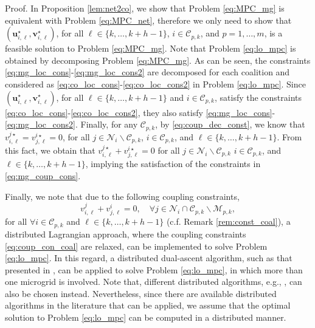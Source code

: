 \begin{pf*}{Proof.}
	In Proposition \ref{lem:net2co}, we show that Problem \eqref{eq:MPC_mg} is equivalent with Problem \eqref{eq:MPC_net}, therefore we only need to show that $(\bm{u}_{i,\ell}^{\star},\bm{v}_{i,\ell}^{\star})$, for all $\ell \in\{k,\dots, k+h-1 \}$, $i\in\mathcal{C}_{p,k}$, and $p=1,\dots,m$, is a feasible solution to Problem \eqref{eq:MPC_mg}. Note that Problem \eqref{eq:lo_mpc} is obtained by decomposing Problem \eqref{eq:MPC_mg}.  As can be seen, the constraints \eqref{eq:mg_loc_cons}-\eqref{eq:mg_loc_cons2} are decomposed for each coalition and considered as \eqref{eq:co_loc_cons}-\eqref{eq:co_loc_cons2} in Problem \eqref{eq:lo_mpc}. Since $(\bm{u}_{i,\ell}^{\star},\bm{v}_{i,\ell}^{\star})$, for all $\ell \in\{k,\dots, k+h-1 \}$ and $i\in\mathcal{C}_{p,k}$, satisfy the constraints \eqref{eq:co_loc_cons}-\eqref{eq:co_loc_cons2}, they also satisfy \eqref{eq:mg_loc_cons}-\eqref{eq:mg_loc_cons2}. Finally, for any $\mathcal{C}_{p,k}$, by \eqref{eq:coup_dec_const}, we know that $v_{i,\ell}^{j\star}=v_{j,\ell}^{i\star}=0$, for all $j\in\mathcal{N}_i\backslash\mathcal{C}_{p,k}$, $i\in\mathcal{C}_{p,k}$, and $\ell\in\{k,\dots, k+h-1 \}$. From this fact, we obtain that $v_{i,\ell}^{j\star}+v_{j,\ell}^{i\star}=0$ for all $j\in\mathcal{N}_i\backslash\mathcal{C}_{p,k}$ $i\in\mathcal{C}_{p,k}$, and $\ell\in\{k,\dots, k+h-1 \}$, implying the satisfaction of the constraints in \eqref{eq:mg_coup_cons}. \eod
\end{pf*}
Finally, we note that due to the following coupling constraints,
\begin{equation}
v_{i,\ell}^j + v_{j,\ell}^i = 0, \quad \forall j \in \mathcal{N}_i\cap\mathcal{C}_{p,k}\backslash\mathcal{M}_{p,k}, \label{eq:coup_con_coal}
\end{equation}
for all  $\forall i \in \mathcal{C}_{p,k}$ and $\ell \in\{k,\dots, k+h-1 \}$ (c.f. Remark \ref{rem:const_coal}), a distributed Lagrangian approach, where the coupling constraints \eqref{eq:coup_con_coal} are relaxed, can be implemented to solve Problem \eqref{eq:lo_mpc}. In this regard, a distributed dual-ascent algorithm, such as that presented in \cite{ananduta2018}, can be applied to solve Problem \eqref{eq:lo_mpc}, in which more than one microgrid is involved. Note that, different distributed algorithms, e.g., \cite{boyd2011,wang2015,kraning2014,baker2016}, can also be chosen instead. Nevertheless, since there are available distributed algorithms in the literature that can be applied, we assume that the optimal solution to Problem \eqref{eq:lo_mpc} can be computed in a distributed manner.



